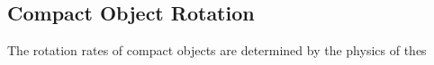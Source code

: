 {\color{orange}

\subsection{Compact Object Rotation}

The rotation rates of compact objects are determined by the physics of thes

}